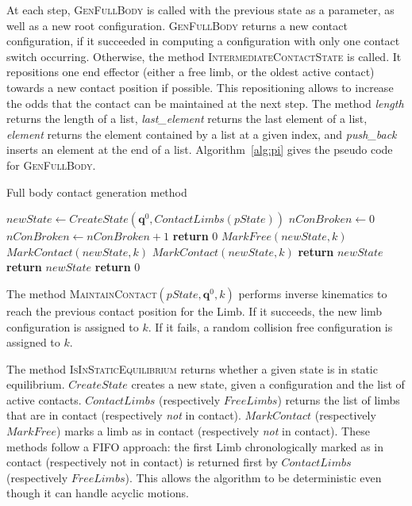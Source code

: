 At each step, \textsc{GenFullBody} is called with the previous state as a parameter, as well
as a new root configuration. \textsc{GenFullBody} returns a new contact configuration, if it succeeded
in computing a configuration with only one contact switch occurring.
Otherwise, the method \textsc{IntermediateContactState} is called.
It repositions one end effector (either a free limb, or the oldest active contact) towards a new contact position if possible.
This repositioning allows to increase the odds that the contact can be maintained at the next step.
The method \textit{length} returns the length of a list, \textit{last\_element} returns the last element
of a list, \textit{element} returns the element contained by a list at a given index, and \textit{push\_back} inserts an element at the end of a list.
Algorithm~\ref{alg:pi} gives the pseudo code for \textsc{GenFullBody}.

\begin{algorithm}[!tbp]
\caption{Full body contact generation method} \label{interpolate}
	\begin{algorithmic}[1]
		\State $newState \gets CreateState(\mathbf{q}^0, ContactLimbs(pState))$
		\State $nConBroken \gets 0$
				\State $nConBroken \gets nConBroken +1$
					\State \textbf{return} $0$
				\EndIf				
				\State $MarkFree(newState,k)$
			\Else 					
				\State $MarkContact(newState,k)$
			\EndIf
		\EndFor
				\State $MarkContact(newState,k)$
				\State \textbf{return} $newState$
			\EndIf
		\EndFor
			\State \textbf{return} $newState$
		\Else
			\State \textbf{return} $0$
		\EndIf
	\EndFunction
\end{algorithmic}
\label{alg:pi}
\end{algorithm}

The method \textsc{MaintainContact}$(pState,\mathbf{q}^0,k)$ performs inverse kinematics to reach the previous contact position for the Limb.
If it succeeds, the new limb configuration is assigned to $k$. If it fails, a random collision free configuration is assigned to $k$.

The method \textsc{IsInStaticEquilibrium} returns whether a given state is in static equilibrium. $CreateState$ creates a new state, given
a configuration and the list of active contacts.
$ContactLimbs$ (respectively $FreeLimbs$) returns the list of limbs that are in contact (respectively \textit{not} in contact).  $MarkContact$ (respectively $MarkFree$)  marks a limb as in contact (respectively \textit{not} in contact). These methods follow a FIFO approach: the first Limb chronologically marked as in contact (respectively not in contact) is returned first by $ContactLimbs$ (respectively $FreeLimbs$). This allows the algorithm to be deterministic even though it can handle acyclic motions.

